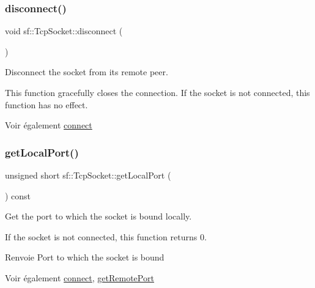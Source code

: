 \subsubsection{\texorpdfstring{disconnect()}{disconnect()}}
{\footnotesize\ttfamily void sf\+::\+Tcp\+Socket\+::disconnect (\begin{DoxyParamCaption}{ }\end{DoxyParamCaption})}



Disconnect the socket from its remote peer. 

This function gracefully closes the connection. If the socket is not connected, this function has no effect.

\begin{DoxySeeAlso}{Voir également}
\hyperlink{classsf_1_1TcpSocket_a68cd42d5ab70ab54b16787f555951c40}{connect} 
\end{DoxySeeAlso}
\mbox{\label{classsf_1_1TcpSocket_a98e45f0f49af1fd99216b9195e86d86b}} 
\subsubsection{\texorpdfstring{get\+Local\+Port()}{getLocalPort()}}
{\footnotesize\ttfamily unsigned short sf\+::\+Tcp\+Socket\+::get\+Local\+Port (\begin{DoxyParamCaption}{ }\end{DoxyParamCaption}) const}



Get the port to which the socket is bound locally. 

If the socket is not connected, this function returns 0.

\begin{DoxyReturn}{Renvoie}
Port to which the socket is bound
\end{DoxyReturn}
\begin{DoxySeeAlso}{Voir également}
\hyperlink{classsf_1_1TcpSocket_a68cd42d5ab70ab54b16787f555951c40}{connect}, \hyperlink{classsf_1_1TcpSocket_a93bced0afd4b1c60797a85725be04951}{get\+Remote\+Port} 
\end{DoxySeeAlso}
\mbox{\label{classsf_1_1TcpSocket_aa8579c203b1fd21beb74d7f76444a94c}} 
